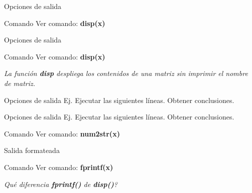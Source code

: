\documentclass{bredelebeamer}
\begin{document}
\begin{frame}{Opciones de salida}
\begin{exampleblock}{Comando}
Ver comando: \textbf{disp(x)}
\end{exampleblock}
\end{frame}

\begin{frame}{Opciones de salida}
\begin{exampleblock}{Comando}
Ver comando: \textbf{disp(x)}
\end{exampleblock}
\begin{center}
\textit{La función \textbf{disp} despliega los contenidos de una matriz sin imprimir el nombre de matriz.}
\end{center}
\end{frame}

\begin{frame}{Opciones de salida}
Ej. Ejecutar las siguientes líneas. Obtener conclusiones.
\end{frame}

\begin{frame}{Opciones de salida}
Ej. Ejecutar las siguientes líneas. Obtener conclusiones.
\begin{exampleblock}{Comando}
Ver comando: \textbf{num2str(x)}
\end{exampleblock}
\end{frame}

\begin{frame}{Salida formateada}
\begin{exampleblock}{Comando}
Ver comando: \textbf{fprintf(x)}
\end{exampleblock}
\begin{center}
\textit{Qué diferencia \textbf{fprintf()} de \textbf{disp()}?}
\end{center}
\end{frame}
\end{document}
